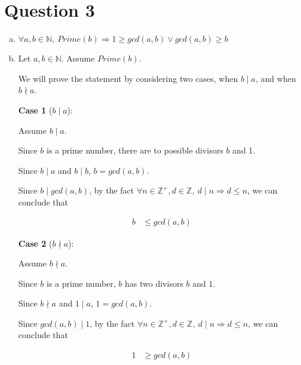 \documentclass[12pt]{article}
\begin{document}
\section*{Question 3}
\begin{enumerate}[a.]
    \item

    $\forall a,b \in \mathbb{N},\:Prime(b) \Rightarrow 1 \geq gcd(a,b) \lor
    gcd(a,b) \geq b$

    \item

    Let $a,b \in \mathbb{N}$. Assume $Prime(b)$.

    \bigskip

    We will prove the statement by considering two cases, when $b \mid a$, and
    when $b \nmid a$.

    \bigskip

    \textbf{Case 1} ($b \mid a$):

    \bigskip

    Assume $b \mid a$.

    \bigskip

    Since $b$ is a prime number, there are to possible divisors $b$ and 1.

    \bigskip

    Since $b \mid a$ and $b \mid b$, $b = gcd(a,b)$.

    \bigskip

    Since $b \mid gcd(a,b)$, by the fact $\forall n \in \mathbb{Z}^{+},
    d \in \mathbb{Z},\: d \mid n \Rightarrow d \leq n$, we can conclude that

    \setcounter{equation}{0}
    \begin{align}
        b &\leq gcd(a,b)
    \end{align}

    \textbf{Case 2} ($b \nmid a$):

    \bigskip

    Assume $b \nmid a$.

    \bigskip

    Since $b$ is a prime number, $b$ has two divisors $b$ and $1$.

    \bigskip

    Since $b \nmid a$ and $1 \mid a$, $1 = gcd(a,b)$.

    \bigskip

    Since $gcd(a,b) \mid 1$, by the fact $\forall n \in \mathbb{Z}^{+},
    d \in \mathbb{Z},\: d \mid n \Rightarrow d \leq n$, we can conclude that

    \setcounter{equation}{0}
    \begin{align}
        1 &\geq gcd(a,b)
    \end{align}

\end{enumerate}
\end{document}
